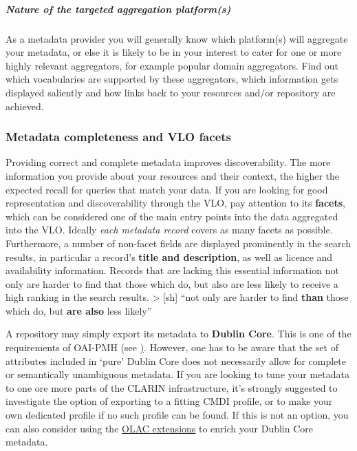 \subparagraph{Nature of the targeted aggregation
platform(s)}\label{nature-of-the-targeted-aggregation-platforms}

As a metadata provider you will generally know which platform(s) will
aggregate your metadata, or else it is likely to be in your interest to
cater for one or more highly relevant aggregators, for example popular
domain aggregators. Find out which vocabularies are supported by these
aggregators, which information gets displayed saliently and how links
back to your resources and/or repository are achieved.

\subsubsection{Metadata completeness and VLO
facets}\label{metadata-completeness-and-vlo-facets}

Providing correct and complete metadata improves discoverability. The
more information you provide about your resources and their context, the
higher the expected recall for queries that match your data. If you are
looking for good representation and discoverability through the VLO, pay
attention to its \textbf{facets}, which can be considered one of the
main entry points into the data aggregated into the VLO. Ideally
\emph{each metadata record} covers as many facets as possible.
Furthermore, a number of non-facet fields are displayed prominently in
the search results, in particular a record's \textbf{title and
description}, as well as licence and availability information. Records
that are lacking this essential information not only are harder to find
that those which do, but also are less likely to receive a high ranking
in the search results. \textgreater{} {[}sh{]} ``not only are harder to
find \textbf{than} those which do, but \textbf{are also} less likely''

A repository may simply export its metadata to \textbf{Dublin Core}.
This is one of the requirements of OAI-PMH (see
\href{https://www.openarchives.org/OAI/2.0/openarchivesprotocol.2015-01-08.htm\#Record}).
However, one has to be aware that the set of attributes included in
`pure' Dublin Core does not necessarily allow for complete or
semantically unambiguous metadata. If you are looking to tune your
metadata to one ore more parts of the CLARIN infrastructure, it's
strongly suggested to investigate the option of exporting to a fitting
CMDI profile, or to make your own dedicated profile if no such profile
can be found. If this is not an option, you can also consider using the
\href{http://www.language-archives.org/OLAC/metadata.html}{OLAC
extensions} to enrich your Dublin Core metadata.

